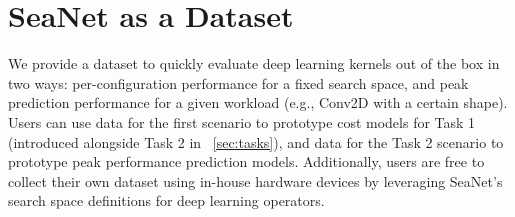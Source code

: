
\section{SeaNet as a Dataset}
We provide a dataset to quickly evaluate deep learning kernels out of the box in two ways:  per-configuration performance for a fixed search space, and peak prediction performance for a given workload (e.g., Conv2D with a certain shape).
Users can use data for the first scenario to prototype cost models for Task 1 (introduced alongside Task 2 in ~\autoref{sec:tasks}), and data for the Task 2 scenario to prototype peak performance prediction models.
Additionally, users are free to collect their own dataset using in-house hardware devices by leveraging SeaNet's search space definitions for deep learning operators.



